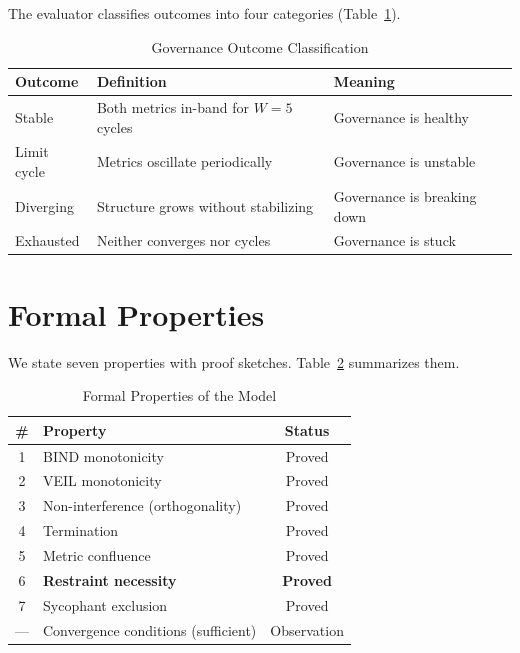 \documentclass[sigconf,nonacm]{acmart}
\begin{document}
The evaluator classifies outcomes into four categories
(Table~\ref{tab:outcomes}).

\begin{table}[t]
  \caption{Governance Outcome Classification}\label{tab:outcomes}
  \small
  \begin{tabular}{@{}lll@{}}
    \toprule
    \textbf{Outcome} & \textbf{Definition} & \textbf{Meaning} \\
    \midrule
    Stable & Both metrics in-band for $W{=}5$ cycles & Governance is healthy \\
    Limit cycle & Metrics oscillate periodically & Governance is unstable \\
    Diverging & Structure grows without stabilizing & Governance is breaking down \\
    Exhausted & Neither converges nor cycles & Governance is stuck \\
    \bottomrule
  \end{tabular}
\end{table}


\section{Formal Properties}\label{sec:formal}

We state seven properties with proof sketches. Table~\ref{tab:properties}
summarizes them.

\begin{table}[t]
  \caption{Formal Properties of the Model}\label{tab:properties}
  \small
  \begin{tabular}{@{}clc@{}}
    \toprule
    \textbf{\#} & \textbf{Property} & \textbf{Status} \\
    \midrule
    1 & BIND monotonicity & Proved \\
    2 & VEIL monotonicity & Proved \\
    3 & Non-interference (orthogonality) & Proved \\
    4 & Termination & Proved \\
    5 & Metric confluence & Proved \\
    6 & \textbf{Restraint necessity} & \textbf{Proved} \\
    \midrule
    7 & Sycophant exclusion & Proved \\
    --- & Convergence conditions (sufficient) & Observation \\
    \bottomrule
  \end{tabular}
\end{table}
\end{document}
